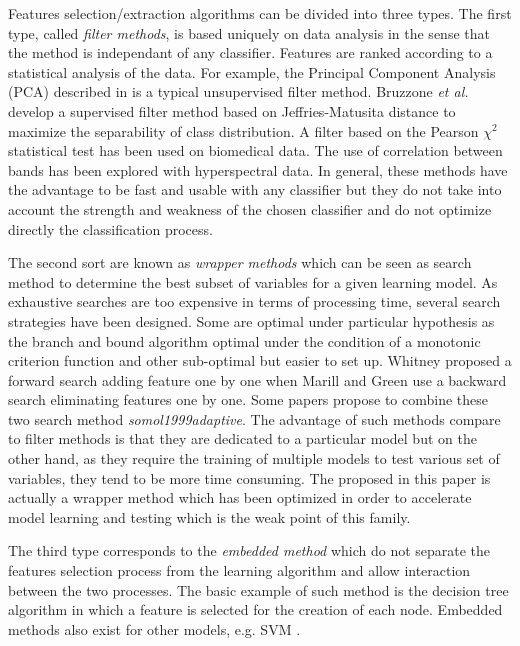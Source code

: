 \documentclass[journal,peerreview,onecolumn]{IEEEtran}
\begin{document}
Features selection/extraction algorithms can be divided into three types. The first type, called \emph{filter methods}, is based uniquely on data analysis in the sense that the method is independant of any classifier. Features are ranked according to a statistical analysis of the data. For example, the Principal Component Analysis (PCA) described in \cite{jimenez1998supervised} is a typical unsupervised filter method. Bruzzone \emph{et al.}\cite{bruzzone1995extension} develop a supervised filter method based on Jeffries-Matusita distance to maximize the separability of class distribution. A filter based on the Pearson $\chi^2$ statistical test has been used on biomedical data\cite{biesiada2007feature}. The use of correlation between bands has been explored with hyperspectral data\cite{demir2008phase}. In general, these methods have the advantage to be fast and usable with any classifier but they do not take into account the strength and weakness of the chosen classifier and do not optimize directly the classification process.

The second sort are known as \emph{wrapper methods} which can be seen as search method to determine the best subset of variables for a given learning model. As exhaustive searches are too expensive in terms of processing time, several search strategies have been designed. Some are optimal under particular hypothesis as the branch and bound algorithm \cite{narendra1977branch} optimal under the condition of a monotonic criterion function and other sub-optimal but easier to set up. Whitney \cite{whitney1971direct} proposed a forward search adding feature one by one \cite{whitney1971direct} when Marill and Green \cite{marill1963effectiveness} use a backward search eliminating features one by one. Some papers propose to combine these two search method \emph{somol1999adaptive}. The advantage of such methods compare to filter methods is that they are dedicated to a particular model but on the other hand, as they require the training of multiple models to test various set of variables, they tend to be more time consuming. The proposed in this paper is actually a wrapper method which has been optimized in order to accelerate model learning and testing which is the weak point of this family.

The third type corresponds to the \emph{embedded method} which do not separate the features selection process from the learning algorithm and allow interaction between the two processes. The basic example of such method is the decision tree algorithm in which a feature is selected for the creation of each node. Embedded methods also exist for other models, e.g. SVM \cite{guyon2002gene,weston2003use}.
\end{document}
